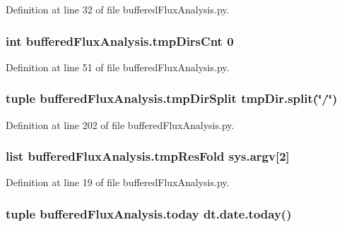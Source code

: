 Definition at line 32 of file buffered\-Flux\-Analysis.\-py.

\hypertarget{namespacebuffered_flux_analysis_ab845ee953d29af3dfb8e8e1c0739b760}{
\subsubsection[{tmp\-Dirs\-Cnt}]{\setlength{\rightskip}{0pt plus 5cm}int buffered\-Flux\-Analysis.\-tmp\-Dirs\-Cnt 0}}\label{namespacebuffered_flux_analysis_ab845ee953d29af3dfb8e8e1c0739b760}


Definition at line 51 of file buffered\-Flux\-Analysis.\-py.

\hypertarget{namespacebuffered_flux_analysis_ab710247ed928de0924b2123e6aec97c9}{
\subsubsection[{tmp\-Dir\-Split}]{\setlength{\rightskip}{0pt plus 5cm}tuple buffered\-Flux\-Analysis.\-tmp\-Dir\-Split tmp\-Dir.\-split(\char`\"{}/\char`\"{})}}\label{namespacebuffered_flux_analysis_ab710247ed928de0924b2123e6aec97c9}


Definition at line 202 of file buffered\-Flux\-Analysis.\-py.

\hypertarget{namespacebuffered_flux_analysis_a3293821a23ed904d4f68dffd94c609e1}{
\subsubsection[{tmp\-Res\-Fold}]{\setlength{\rightskip}{0pt plus 5cm}list buffered\-Flux\-Analysis.\-tmp\-Res\-Fold sys.\-argv\mbox{[}2\mbox{]}}}\label{namespacebuffered_flux_analysis_a3293821a23ed904d4f68dffd94c609e1}


Definition at line 19 of file buffered\-Flux\-Analysis.\-py.

\hypertarget{namespacebuffered_flux_analysis_a37cf8287ac5d9f5b83732efe352cf154}{
\subsubsection[{today}]{\setlength{\rightskip}{0pt plus 5cm}tuple buffered\-Flux\-Analysis.\-today dt.\-date.\-today()}}\label{namespacebuffered_flux_analysis_a37cf8287ac5d9f5b83732efe352cf154}


